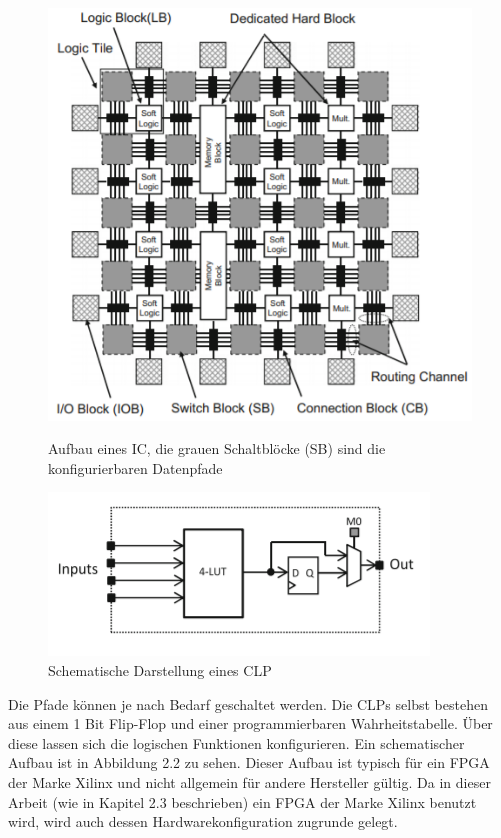 \begin{figure}[ht]
	\begin{minipage}[b]{.4\linewidth}
  		\includegraphics[scale=0.7]{bilder/matrix}
  		\caption{Aufbau eines IC, die grauen Schaltblöcke (SB) sind die konfigurierbaren Datenpfade}
  	\end{minipage}
  	\hspace{.1\linewidth}%
  	\begin{minipage}[b]{.4\linewidth}
  		\includegraphics[scale=0.70]{bilder/clp}
		\caption{Schematische Darstellung eines CLP\\
		}
	\end{minipage}
	
\end{figure}
Die Pfade können je nach Bedarf geschaltet werden. Die CLPs selbst bestehen aus einem 1 Bit Flip-Flop und einer programmierbaren Wahrheitstabelle. Über diese lassen sich die logischen Funktionen konfigurieren.\cite{TOSU} Ein schematischer Aufbau ist in Abbildung 2.2 zu sehen. Dieser Aufbau ist typisch für ein FPGA der Marke Xilinx und nicht allgemein für andere Hersteller gültig. Da in dieser Arbeit (wie in Kapitel 2.3 beschrieben) ein FPGA der Marke Xilinx benutzt wird, wird auch dessen Hardwarekonfiguration zugrunde gelegt.\\\\
